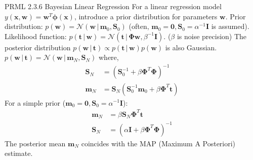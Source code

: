\documentclass{beamer} %
\newcommand{\mat}[1]{\mathbf{#1}}
\newcommand{\vect}[1]{\mathbf{#1}}
\newcommand{\given}{\,|\,}
\begin{document}
\begin{frame}{PRML 2.3.6 Bayesian Linear Regression}
  For a linear regression model $y(\vect{x}, \vect{w}) = \vect{w}^T \boldsymbol{\phi}(\vect{x})$, introduce a prior distribution for parameters $\vect{w}$.
  Prior distribution: $p(\vect{w}) = \mathcal{N}(\vect{w} \given \vect{m}_0, \mat{S}_0)$ (often, $\vect{m}_0=\mathbf{0}, \mat{S}_0=\alpha^{-1}\mat{I}$ is assumed).
  Likelihood function: $p(\vect{t} \given \vect{w}) = \mathcal{N}(\vect{t} \given \mat{\Phi}\vect{w}, \beta^{-1}\mat{I})$. ($\beta$ is noise precision)
  \vspace{0.5em}
  The posterior distribution $p(\vect{w} \given \vect{t}) \propto p(\vect{t} \given \vect{w}) p(\vect{w})$ is also Gaussian.
  $p(\vect{w} \given \vect{t}) = \mathcal{N}(\vect{w} \given \vect{m}_N, \mat{S}_N)$
  where,
  \begin{align*}
    \mat{S}_N &= (\mat{S}_0^{-1} + \beta \mat{\Phi}^T \mat{\Phi})^{-1} \\
    \vect{m}_N &= \mat{S}_N (\mat{S}_0^{-1} \vect{m}_0 + \beta \mat{\Phi}^T \vect{t})
  \end{align*}
  For a simple prior ($\vect{m}_0=\mathbf{0}, \mat{S}_0=\alpha^{-1}\mat{I}$):
  \begin{align*}
    \vect{m}_N &= \beta \mat{S}_N \mat{\Phi}^T \vect{t} \\
    \mat{S}_N &= (\alpha\mat{I} + \beta \mat{\Phi}^T \mat{\Phi})^{-1}
  \end{align*}
  The posterior mean $\vect{m}_N$ coincides with the MAP (Maximum A Posteriori) estimate.
\end{frame}
\end{document}
